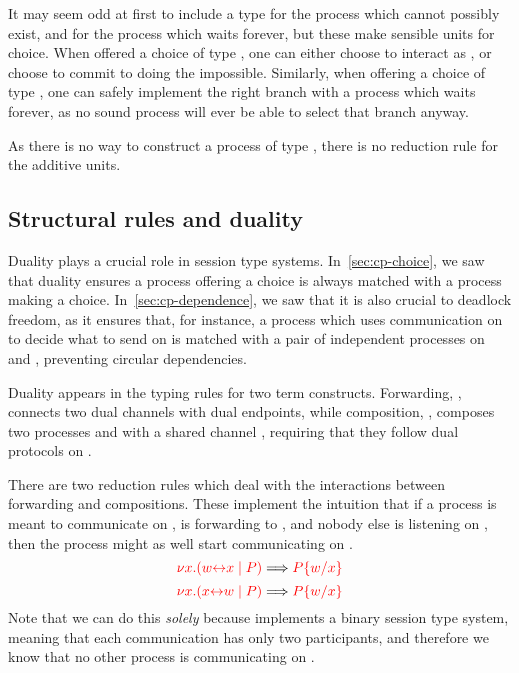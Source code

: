 It may seem odd at first to include a type for the process which cannot possibly
exist, and for the process which waits forever, but these make sensible units
for choice.
When offered a choice of type , one can either choose to
interact as , or choose to commit to doing the impossible.
Similarly, when offering a choice of type , one can safely
implement the right branch with a process which waits forever, as no sound
process will ever be able to select that branch anyway.
\begin{center}
  \cpInfNil
  \cpInfTop
\end{center}
As there is no way to construct a process of type \ty{\nil}, there is no
reduction rule for the additive units.


\subsection{Structural rules and duality}\label{sec:cp-duality}
Duality plays a crucial role in session type systems.
In~\cref{sec:cp-choice}, we saw that duality ensures a process offering a choice
is always matched with a process making a choice.
In~\cref{sec:cp-dependence}, we saw that it is also crucial to deadlock freedom,
as it ensures that, for instance, a process which uses communication on 
to decide what to send on  is matched with a pair of independent processes
on  and , preventing circular dependencies.

Duality appears in the typing rules for two \rcp term constructs.
Forwarding, , connects two dual channels with dual endpoints,
while composition, , composes two processes  and
 with a shared channel , requiring that they follow dual protocols
on .
\begin{center}
  \cpInfAx
  \cpInfCut
\end{center}
There are two reduction rules which deal with the interactions between
forwarding and compositions. These implement the intuition that if a process is
meant to communicate on ,  is forwarding to , and nobody else
is listening on , then the process might as well start communicating on
.
\[
  \tm{\cpCut{x}{\cpLink{w}{x}}{P}} \Longrightarrow \tm{\cpSub{w}{x}{P}} 
\]
\[
  \tm{\cpCut{x}{\cpLink{x}{w}}{P}} \Longrightarrow \tm{\cpSub{w}{x}{P}}  
\]
Note that we can do this \emph{solely} because \rcp implements a binary session
type system, meaning that each communication has only two participants, and
therefore we know that no other process is communicating on .


